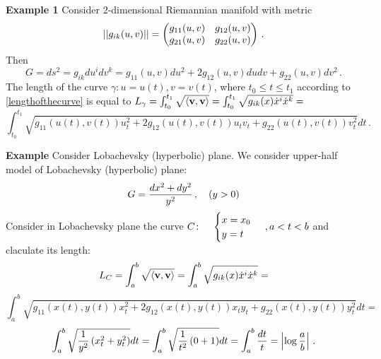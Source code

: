 \documentclass[12pt]{article}
\theoremstyle{theorem}
\numberwithin{equation}{section}
\begin{document}
{\bf Example 1}
Consider $2$-dimensional Riemannian manifold with metric
                    $$
                 ||g_{ik}(u,v)||=
                     \begin{pmatrix}
                     g_{11}(u,v) &g_{12}(u,v)\cr
                     g_{21}(u,v) &g_{22}(u,v)\cr
                    \end{pmatrix}\,.
                    $$
        Then
                           $$
 G=ds^2=g_{ik}du^idv^k=g_{11}(u,v)du^2+2g_{12}(u,v)dudv+g_{22}(u,v)dv^2\,.
                         $$
     The length of the curve
$\gamma\colon u=u(t),v=v(t)$, where $t_0\leq t\leq t_1$
                according to \eqref{lengthofthecurve} is equal to
$L_\gamma=\int_{t_0}^{t_1} \sqrt {\langle{\bf v},{\bf v}\rangle}=
  \int_{t_0}^{t_1} \sqrt {g_{ik}(x)\dot x^i \dot x^k}=$
  \begin{equation}
\int_{t_0}^{t_1}
\sqrt {{g_{11}}\left(u\left(t\right),v\left(t\right)\right)u_t^2
+2{g_{12}}\left(u\left(t\right),v\left(t\right)\right)u_tv_t+
{g_{22}}\left(u\left(t\right),v\left(t\right)\right)v_t^2}dt\,.
\end{equation}

\smallskip


{\bf Example}   Consider  Lobachevsky
 (hyperbolic)  plane.  We consider upper-half model of Lobachevsky 
(hyperbolic) plane:  
   $$
G={dx^2+dy^2\over y^2}\,,\quad (y>0)
   $$  
Consider in Lobachevsky plane the curve
     $
C\colon\quad \begin{cases}x=x_0\cr y=t\end{cases}\,, a<t<b
     $
and claculate its length:
      $$
      L_C=\int_{a}^{b} \sqrt {\langle{\bf v},{\bf v}\rangle}=
  \int_{a}^{b} \sqrt {g_{ik}(x)\dot x^i \dot x^k}=
        $$
       $$
\int_{a}^{b}
\sqrt {{g_{11}}\left(x\left(t\right),y\left(t\right)\right)x_t^2
+2{g_{12}}\left(x\left(t\right),y\left(t\right)\right)x_ty_t+
{g_{22}}\left(x\left(t\right),y\left(t\right)\right)y_t^2}dt=
      $$
       $$
\int_{a}^{b}
\sqrt {{1\over y^2}\left(x_t^2
+y_t^2\right)}dt=
\int_{a}^{b}
\sqrt {{1\over t^2}\left(0
+1\right)}dt=\int_a^b{dt\over t}=
  \left|\log {a\over b}\right|\,.
      $$

\m
\end{document}
